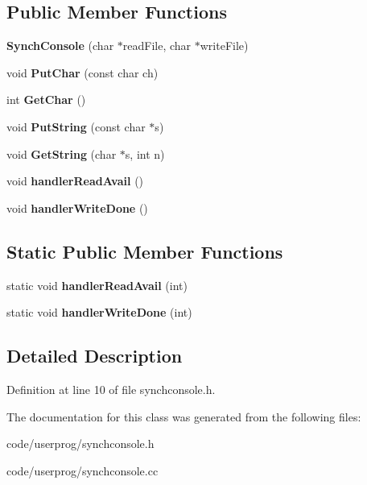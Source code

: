 \subsection*{Public Member Functions}
\begin{DoxyCompactItemize}
\item 
{\bfseries Synch\+Console} (char $\ast$read\+File, char $\ast$write\+File)\label{class_synch_console_a888915fb5c11051308853603ccf0e436}

\item 
void {\bfseries Put\+Char} (const char ch)\label{class_synch_console_a604aabb23deed2795dccd343d63c5692}

\item 
int {\bfseries Get\+Char} ()\label{class_synch_console_a58ca9990bb4eea2acb7f42e340b10d26}

\item 
void {\bfseries Put\+String} (const char $\ast$s)\label{class_synch_console_a418e6285c64156cee661cb6fbffae5e7}

\item 
void {\bfseries Get\+String} (char $\ast$s, int n)\label{class_synch_console_a2003d238e6fb4fa6a3a2b8ff31bedd7e}

\item 
void {\bfseries handler\+Read\+Avail} ()\label{class_synch_console_ab4f1b48fbf66efb13e7b8ff7fe8c930a}

\item 
void {\bfseries handler\+Write\+Done} ()\label{class_synch_console_a7537f191fbc6a4e5e78478f4d985c10c}

\end{DoxyCompactItemize}
\subsection*{Static Public Member Functions}
\begin{DoxyCompactItemize}
\item 
static void {\bfseries handler\+Read\+Avail} (int)\label{class_synch_console_ab15b6af88078b3cc8f88f1f19cb7e66d}

\item 
static void {\bfseries handler\+Write\+Done} (int)\label{class_synch_console_ab3eb4e79b68ae8f4acefe51789819add}

\end{DoxyCompactItemize}


\subsection{Detailed Description}


Definition at line 10 of file synchconsole.\+h.



The documentation for this class was generated from the following files\+:\begin{DoxyCompactItemize}
\item 
code/userprog/synchconsole.\+h\item 
code/userprog/synchconsole.\+cc\end{DoxyCompactItemize}
